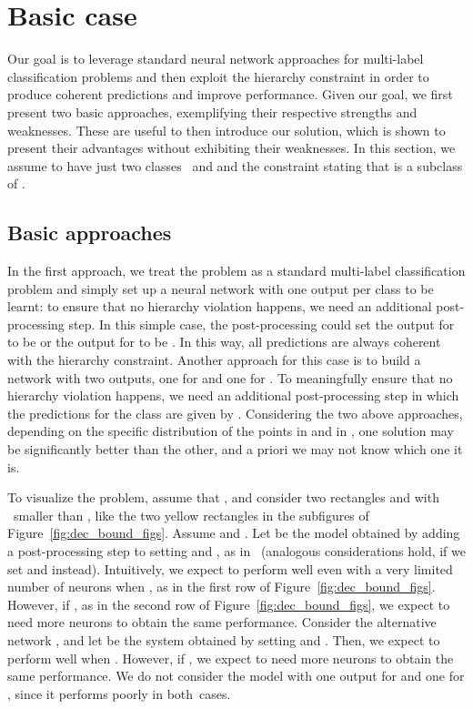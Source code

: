 \documentclass{article}
\begin{document}
\section{Basic case}\label{sec:basic_case}







Our goal is to leverage standard neural network approaches for multi-label classification problems and then exploit the hierarchy constraint in order to produce coherent predictions and improve performance.
Given our goal,
we first present two basic approaches, 
exemplifying their respective strengths and weaknesses. These are useful to then introduce our solution, which
is shown to present their advantages without exhibiting their weaknesses. In this section, we assume to have just two classes~ and  and the constraint stating that  is a subclass of . 

\subsection{Basic approaches}\label{subsec:approaches}

In the first approach, we treat the problem as a standard multi-label classification problem and simply set up a neural network  with one output per class to be learnt: to ensure that no hierarchy violation happens, we need an additional post-processing step. In this simple case, the post-processing could set the output for  to be  or the output for  to be . In this way, all predictions are always coherent with the hierarchy constraint.
Another approach for this case is to build a network  with two outputs, one for  and one for . To meaningfully ensure that no hierarchy violation happens, we need an additional post-processing step in which the predictions for the class  are given by .
Considering the two above approaches, depending on the specific distribution of the points in  and in , one solution may be significantly better than the other, and a priori we may not know which one it is.

To visualize the problem, assume that , and consider two rectangles  and  with ~smal\-ler than , like the two yellow rectangles in the subfigures of Figure~\ref{fig:dec_bound_figs}. Assume  and .
Let  be the model obtained by adding a post-processing step to  setting  and , as in~\cite{cerri2014,cerri2016,feng2018} (analogous considerations hold, if we set  and  instead). Intuitively, we expect  to perform well even with a very limited number of neurons when , as in the first row of Figure~\ref{fig:dec_bound_figs}.
However, if , as in the second row of Figure~\ref{fig:dec_bound_figs}, we expect  to need more neurons to obtain the same performance.
Consider the alternative network , and
let  be the system obtained by setting  and .
Then, we expect  to perform well when .
However, if , we expect  to need  more neurons to obtain the same performance. We do not consider the model with one output for  and one for , since it performs poorly in both~cases.
\end{document}
